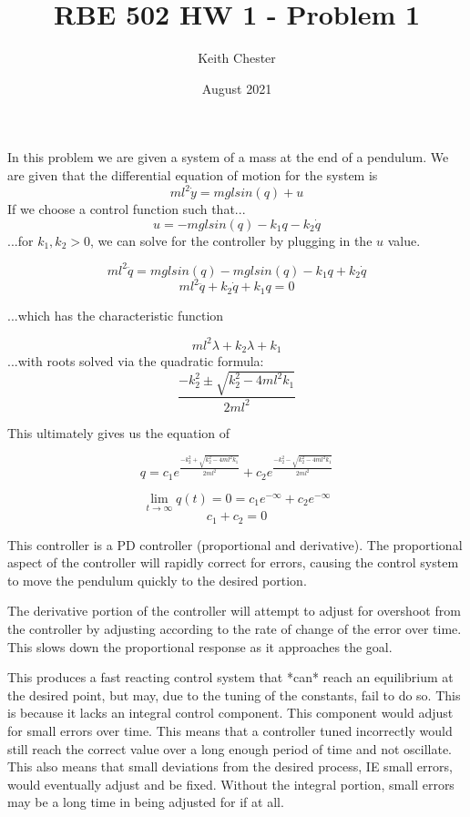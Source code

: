 \documentclass{article}
\title{RBE 502 HW 1 - Problem 1}
\author{Keith Chester}
\date{August 2021}
\begin{document}
\maketitle

In this problem we are given a system of a mass at the end of a pendulum. We are given that the differential equation of motion for the system is \[ml^2\dot y=mglsin(q)+u\]
If we choose a control function such that...
\[u=-mglsin(q)-k_1q-k_2\dot q\]
...for \(k_1,k_2>0\), we can solve for the controller by plugging in the \(u\) value.

\[ml^2\ddot q =mglsin(q)-mglsin(q)-k_1q+k_2\dot q\]
\[ml^2\ddot q + k_2\dot q + k_1 q = 0\]

...which has the characteristic function

\[ml^2\lambda + k_2\lambda + k_1\]
...with roots solved via the quadratic formula:
\[ \frac{-k_2^2 \pm \sqrt{k_2^2-4ml^2k_1}}{2ml^2}\]

This ultimately gives us the equation of

\[q = c_1e^{\frac{-k_2^2 + \sqrt{k_2^2-4ml^2k_1}}{2ml^2}} + c_2e^{\frac{-k_2^2 - \sqrt{k_2^2-4ml^2k_1}}{2ml^2}}\]

\[\lim_{t \to \infty} q(t) = 0 = c_1e^{-\infty}+c_2e^{-\infty}\]
\[c_1+c_2 = 0\]

This controller is a PD controller (proportional and derivative). The proportional aspect of the controller will rapidly correct for errors, causing the control system to move the pendulum quickly to the desired portion.

The derivative portion of the controller will attempt to adjust for overshoot from the controller by adjusting according to the rate of change of the error over time. This slows down the proportional response as it approaches the goal.

This produces a fast reacting control system that *can* reach an equilibrium at the desired point, but may, due to the tuning of the constants, fail to do so. This is because it lacks an integral control component. This component would adjust for small errors over time. This means that a controller tuned incorrectly would still reach the correct value over a long enough period of time and not oscillate. This also means that small deviations from the desired process, IE small errors, would eventually adjust and be fixed. Without the integral portion, small errors may be a long time in being adjusted for if at all.
\end{document}
